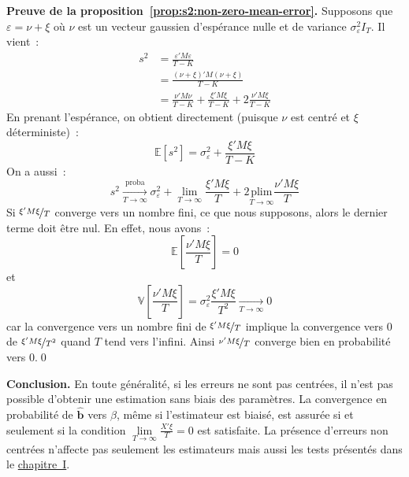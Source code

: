 \documentclass[10pt,a4paper]{article}
\newcommand{\siteurl}{https://le-mans.adjemian.eu/econometrics}
\newcommand{\chapref}[2]{\href{\siteurl/chapitre-#1.pdf}{chapitre~#2}}
\newcommand{\plim}{\xrightarrow[T\rightarrow\infty]{\text{proba}}}
\theoremstyle{definition}
\begin{document}
\begin{notes}
  \textbf{Preuve de la proposition~\ref{prop:s2:non-zero-mean-error}.} Supposons que $\varepsilon = \nu + \xi$ où $\nu$ est un vecteur gaussien d'espérance nulle et de variance $\sigma_{\varepsilon}^2I_T$. Il vient~:
  \[
    \begin{split}
      s^2 &= \frac{\varepsilon'M\varepsilon}{T-K}\\
          &= \frac{\left(\nu+\xi\right)'M\left(\nu+\xi\right)}{T-K}\\
          &= \frac{\nu'M\nu}{T-K} + \frac{\xi'M\xi}{T-K} + 2\frac{\nu'M\xi}{T-K}
    \end{split}
  \]
  En prenant l'espérance, on obtient directement (puisque $\nu$ est centré et $\xi$ déterministe)~:
  \[
    \mathbb E\left[ s^2 \right] = \sigma_{\varepsilon}^2 + \frac{\xi'M\xi}{T-K}
  \]
  On a aussi~:
  \[
    s^2 \plim \sigma_{\varepsilon}^2 + \underset{T\rightarrow\infty}{\lim}\frac{\xi'M\xi}{T} + 2\underset{T\rightarrow\infty}{\text{plim}}\frac{\nu'M\xi}{T}
  \]
  Si $\nicefrac{\xi'M\xi}{T}$ converge vers un nombre fini, ce que nous supposons, alors le dernier terme doit être nul. En effet, nous avons~:
  \[
    \mathbb E\left[ \frac{\nu'M\xi}{T} \right] = 0
  \]
  et
  \[
    \mathbb V\left[ \frac{\nu'M\xi}{T} \right] = \sigma_{\varepsilon}^2 \frac{\xi'M\xi}{T^2} \underset{T\rightarrow\infty}{\longrightarrow} 0
    \]
    car la convergence vers un nombre fini de $\nicefrac{\xi'M\xi}{T}$ implique la convergence vers 0 de $\nicefrac{\xi'M\xi}{T^2}$ quand $T$ tend vers l'infini. Ainsi $\nicefrac{\nu'M\xi}{T}$ converge bien en probabilité vers 0.\qed

    \bigskip

    \textbf{Conclusion.} En toute généralité, si les erreurs ne sont pas centrées, il n'est pas possible d'obtenir une estimation sans biais des paramètres. La convergence en probabilité de $\hat{\mathbf b}$ vers $\beta$, même si l'estimateur est biaisé, est assurée si et seulement si la condition $\underset{T\rightarrow\infty}{\lim}\frac{X'\xi}{T}=0$ est satisfaite. La présence d'erreurs non centrées n'affecte pas seulement les estimateurs mais aussi les tests présentés dans le \chapref{1}{I}.

\end{notes}
\end{document}
